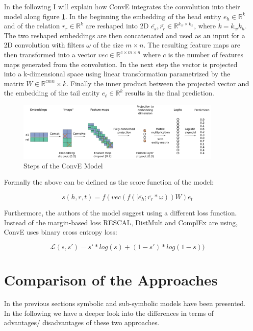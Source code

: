 In the following I will explain how ConvE integrates the convolution into their model along figure \ref{fig:conve}. In the beginning the embedding of the head entity $e_h \in \mathbb{R}^k$ and of the relation $r_r \in \mathbb{R}^k$ are reshaped into 2D $\bar{e_s},\bar{r_r} \in \mathbb{R}^{k_w \times k_h}$, where $k=k_wk_h$.
The two reshaped embeddings are then concatenated and used as an input for a 2D convolution with filters $\omega$ of the size $m \times n$.
The resulting feature maps are then transformed into a vector $vec \in \mathbb{R}^{c \times m \times n}$ where $c$ is the number of features maps generated from the convolution. 
In the next step the vector is projected into a k-dimensional space using linear transformation parametrized by the matrix $W \in \mathbb{R}^{cmn} \times k$. Finally the inner product between the projected vector and the embedding of the tail entity $e_t \in \mathbb{R}^k$ results in the final prediction. \cite{dettmers_convolutional_2018}

\begin{figure}[H]
\centering
\includegraphics[width=0.9\textwidth]{images/conve.png}
\caption{Steps of the ConvE Model}
\label{fig:conve}
\end{figure}

Formally the above can be defined as the score function of the model:

\begin{equation}
s(h,r,t)=f(vec(f([\bar{e_h};\bar{r_r} * \omega))W)e_t
\end{equation}

Furthermore, the authors of the model suggest using a different loss function. Instead of the margin-based loss RESCAL, DistMult and ComplEx are using, ConvE uses binary cross entropy loss: 

\begin{equation}
\mathcal{L}(s,s') = s'*log(s)+(1-s')*log(1-s))
\end{equation}

\section{Comparison of the Approaches}
\label{cha:compare_approaches}
In the previous sections symbolic and sub-symbolic models have been presented. In the following we have a deeper look into the differences in terms of advantages/ disadvantages of these two approaches.

